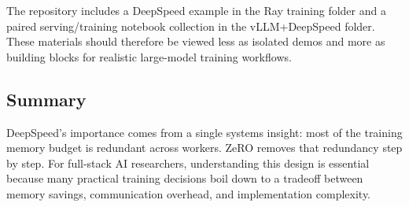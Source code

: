 \documentclass[class=article,crop=false]{standalone}
\begin{document}
The repository includes a DeepSpeed example in the Ray training folder and a paired serving/training notebook collection in the vLLM+DeepSpeed folder. These materials should therefore be viewed less as isolated demos and more as building blocks for realistic large-model training workflows.

\subsection{Summary}
\label{sec:deepspeed:summary}

DeepSpeed's importance comes from a single systems insight: most of the training memory budget is redundant across workers. ZeRO removes that redundancy step by step. For full-stack AI researchers, understanding this design is essential because many practical training decisions boil down to a tradeoff between memory savings, communication overhead, and implementation complexity.
\end{document}
